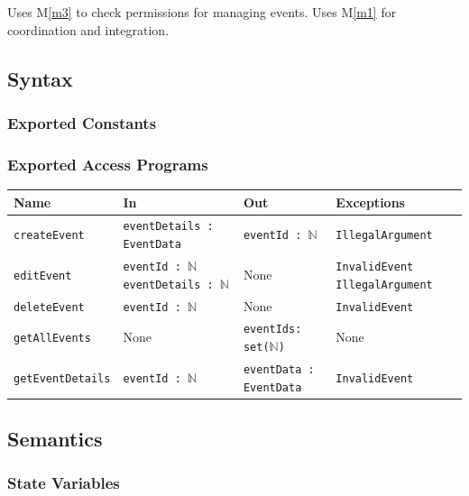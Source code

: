 \documentclass[12pt, titlepage]{article}
\begin{document}
Uses M\ref{m3} to check permissions for managing events. Uses M\ref{m1} for coordination and integration.

\subsection{Syntax}

\subsubsection{Exported Constants}

\subsubsection{Exported Access Programs}

\begin{center}
\begin{tabularx}{\textwidth}{p{} p{} p{} p{}}
\hline
\textbf{Name} & \textbf{In} & \textbf{Out} & \textbf{Exceptions} \\
\hline
\texttt{createEvent} & \texttt{eventDetails : EventData} & \texttt{eventId : $\mathbb{N}$} & \texttt{IllegalArgument} \\
\hline
\texttt{editEvent} & \texttt{eventId : $\mathbb{N}$ \newline eventDetails : $\mathbb{N}$} & None & \texttt{InvalidEvent} \newline \texttt{IllegalArgument} \\
\hline
\texttt{deleteEvent} & \texttt{eventId : $\mathbb{N}$} & None & \texttt{InvalidEvent} \\
\hline
\texttt{getAllEvents} & None & \texttt{eventIds: set($\mathbb{N}$)} & None \\
\hline
\texttt{getEventDetails} & \texttt{eventId : $\mathbb{N}$} & \texttt{eventData : EventData} & \texttt{InvalidEvent} \\
\hline
\end{tabularx}
\end{center}

\subsection{Semantics}

\subsubsection{State Variables}
\end{document}
